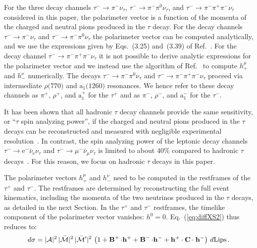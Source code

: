 \documentclass[a4paper,12pt,twocolumn]{article}
\numberwithin{equation}{section} %
\newcommand{\CC}{\operatorname{\bf C}}
\newcommand{\Pagne}{\ensuremath{\bar{\nu}_{\textrm{e}}}\xspace}
\newcommand{\Pagngm}{\ensuremath{\bar{\nu}_{\mu}}\xspace}
\newcommand{\Pai}{\ensuremath{\textrm{a}_{1}\textrm{(1260)}}\xspace}
\newcommand{\Pam}{\ensuremath{\textrm{a}_{1}^{-}}\xspace}
\newcommand{\Pap}{\ensuremath{\textrm{a}_{1}^{+}}\xspace}
\newcommand{\Pem}{\ensuremath{\textrm{e}^{-}}\xspace}
\newcommand{\Pgmm}{\ensuremath{\mu}^{-}\xspace}
\newcommand{\Pgngt}{\ensuremath{\nu_{\tau}}\xspace}
\newcommand{\Pgpm}{\ensuremath{\pi^{-}}\xspace}
\newcommand{\Pgpp}{\ensuremath{\pi^{+}}\xspace}
\newcommand{\Pgpz}{\ensuremath{\pi^{\textrm{0}}}\xspace}
\newcommand{\Pgri}{\ensuremath{\rho\textrm{(770)}}\xspace}
\newcommand{\Pgrm}{\ensuremath{\rho^{-}}\xspace}
\newcommand{\Pgrp}{\ensuremath{\rho^{+}}\xspace}
\newcommand{\Pgt}{\ensuremath{\tau}\xspace}
\newcommand{\Pgtm}{\ensuremath{\tau^{-}}\xspace}
\newcommand{\Pgtp}{\ensuremath{\tau^{+}}\xspace}
\newcommand{\h}{\ensuremath{h}\xspace}
\newcommand{\hvecp}{\ensuremath{\mathbf{h}^{+}}\xspace}
\newcommand{\hvecm}{\ensuremath{\mathbf{h}^{-}}\xspace}
\newcommand{\Bvecp}{\ensuremath{\operatorname{\mathbf{B}}^{+}}\xspace}
\newcommand{\Bvecm}{\ensuremath{\operatorname{\mathbf{B}}^{-}}\xspace}
\begin{document}
For the three decay channels $\Pgtm \to \Pgpm\Pgngt$, $\Pgtm \to \Pgpm\Pgpz\Pgngt$, and $\Pgtm \to \Pgpm\Pgpp\Pgpm\Pgngt$ considered in this paper, the polarimeter vector is a function of the momenta of the charged and neutral pions produced in the $\Pgt$ decay.
For the decay channels $\Pgtm \to \Pgpm\Pgngt$ and $\Pgtm \to \Pgpm\Pgpz\Pgngt$ the polarimeter vector can be computed analytically, and we use the expressions given by Eqs.~(3.25) and~(3.39) of Ref.~\cite{Jadach:1990mz}. For the decay channel $\Pgtm \to \Pgpm\Pgpp\Pgpm\Pgngt$ it is not possible to derive analytic expressions for the polarimeter vector and we instead use the algorithm of Ref.~\cite{Cherepanov:2023wfp} to compute $h_{+}^{\mu}$ and $h_{-}^{\nu}$ numerically.
The decays $\Pgtm \to \Pgpm\Pgpz\Pgngt$ and $\Pgtm \to \Pgpm\Pgpp\Pgpm\Pgngt$ proceed via intermediate $\Pgri$ and $\Pai$ resonances. We hence refer to these decay channels as $\Pgpp$, $\Pgrp$, and $\Pap$ for the $\Pgtp$ and as $\Pgpm$, $\Pgrm$, and $\Pam$ for the $\Pgtm$.

It has been shown that all hadronic $\Pgt$ decay channels provide the same sensitivity, or ``$\Pgt$ spin analyzing power'', if the  charged and neutral pions produced in the $\Pgt$ decays can be reconstructed and measured with negligible experimental resolution~\cite{Kuhn:1995nn}.
In contrast, the spin analyzing power of the leptonic decay channels $\Pgtm \to \Pem\Pagne\Pgngt$ and $\Pgtm \to \Pgmm\Pagngm\Pgngt$ is limited to about $40\%$ compared to hadronic $\Pgt$ decays~\cite{Davier:1992nw}.
For this reason, we focus on hadronic $\Pgt$ decays in this paper.

The polarimeter vectors $\h_{+}^{\mu}$ and $\h_{-}^{\nu}$ need to be computed in the restframes of the $\Pgtp$ and $\Pgtm$.
The restframes are determined by reconstructing the full event kinematics, including the momenta of the two neutrinos produced in the $\Pgt$ decays, as detailed in the next Section.
In the $\Pgtp$ and $\Pgtm$ restframes, the timelike component of the polarimeter vector vanishes: $h^{0} = 0$.
Eq.~(\ref{eq:diffXS2}) thus reduces to:
\begin{equation}
d\sigma = \vert\mathcal{A}\vert^{2} \, \vert\mathcal{\bar{M}}\vert^{2} \, \vert\mathcal{\bar{M}'}\vert^{2} \, \left( 1 + \Bvecp \cdot \hvecp + \Bvecm \cdot \hvecm + \hvecp \cdot \CC \cdot \;\hvecm \right) \, d\textrm{Lips} \, .
\label{eq:diffXS3}
\end{equation}
\end{document}
